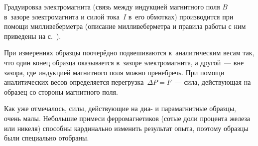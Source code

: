 Градуировка электромагнита (связь между индукцией магнитного поля $B$ в~зазоре электромагнита и силой тока~$I$ в~его
обмотках) производится при помощи милливеберметра (описание милливеберметра и правила работы с ним приведены на
с.~\pageref{MWB}).

При измерениях образцы поочерёдно подвешиваются к~аналитическим весам так, что один конец образца оказывается в~зазоре
электромагнита, а другой~--- вне зазора, где индукцией магнитного поля можно пренебречь. При помощи аналитических весов
определяется перегрузка~$\Delta P=F$~--- сила, действующая на образец со стороны магнитного поля.

Как уже отмечалось, силы, действующие на диа- и парамагнитные образцы, очень малы. Небольшие примеси ферромагнетиков
(сотые доли процента железа или никеля) способны кардинально изменить результат опыта, поэтому образцы были специально
отобраны.

